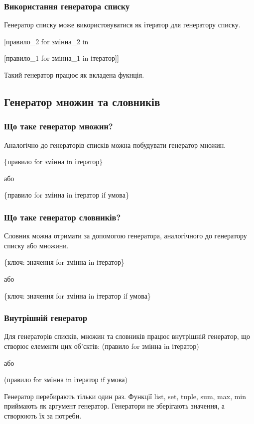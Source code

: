 \begin{frame}
\frametitle{Використання генератора списку}
Генератор списку може використовуватися як ітератор для генератору списку.

\vspace{1cm}

\LARGE{[правило\_2 for змінна\_2 in 

[правило\_1 for змінна\_1 in ітератор]]}

\vspace{1cm}

\normalsize Такий генератор працює як вкладена фукнція.

\end{frame}

\subsection{Генератор множин та словників}
\begin{frame}
\frametitle{Що таке генератор множин?}
Аналогічно до генераторів списків можна побудувати генератор множин.

\LARGE{\{правило for змінна in ітератор\}}

\normalsize або

\LARGE{\{правило for змінна in ітератор if умова\}}

\end{frame}

 \begin{frame}
\frametitle{Що таке генератор словників?}
Словник можна отримати за допомогою генератора, аналогічного до генератору списку або множини.

\Large{\{ключ: значення for змінна in ітератор\}}

\normalsize або

\Large{\{ключ: значення for змінна in ітератор if умова\}}

\end{frame}

\begin{frame}
\frametitle{Внутрішній генератор}
Для генераторів списків, множин та словників працює внутрішній генератор, що створює елементи цих об'єктів:
\Large{(правило for змінна in ітератор)}

\normalsize або

\Large{(правило for змінна in ітератор if умова)}

\normalsize Генератор перебирають тільки один раз. Функції list, set, tuple, sum, max, min приймають як аргумент генератор. Генератори не зберігають значення, а створюють їх за потреби.


\end{frame}

